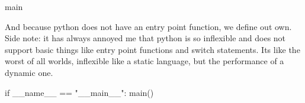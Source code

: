 \documentclass[10pt, a4paper]{article}
\begin{document}
\begin{codeblock}{main}
\begin{code}
\end{code}

And because python does not have an entry point function, we define out own. Side note: it has always annoyed me that python is so inflexible and does not support basic things like entry point functions and switch statements. Its like the worst of all worlds, inflexible like a static language, but the performance of a dynamic one.    

\begin{code}
if __name__ == "__main__":
	main()
\end{code}
\end{codeblock}

\printindex
\end{document}
